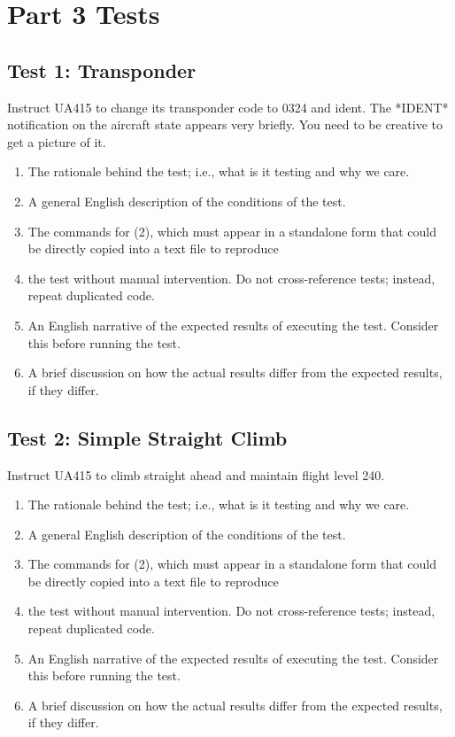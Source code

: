 \documentclass[letterpaper, 12pt]{article}
\begin{document}
\section{Part 3 Tests}

\subsection{Test 1: Transponder}
Instruct UA415 to change its transponder code to 0324 and ident. 
The *IDENT* notification on the aircraft state appears very briefly. You need to be creative to get a picture of it.
\begin{enumerate}
\item The rationale behind the test; i.e., what is it testing and why we care.
\item A general English description of the conditions of the test.
\item The commands for (2), which must appear in a standalone form that could be directly copied into a text file to reproduce
\item the test without manual intervention. Do not cross-reference tests; instead, repeat duplicated code.
\item An English narrative of the expected results of executing the test. Consider this before running the test.
\item A brief discussion on how the actual results differ from the expected results, if they differ.
\end{enumerate}

\subsection{Test 2: Simple Straight Climb}
Instruct UA415 to climb straight ahead and maintain flight level 240.
\begin{enumerate}
\item The rationale behind the test; i.e., what is it testing and why we care.
\item A general English description of the conditions of the test.
\item The commands for (2), which must appear in a standalone form that could be directly copied into a text file to reproduce
\item the test without manual intervention. Do not cross-reference tests; instead, repeat duplicated code.
\item An English narrative of the expected results of executing the test. Consider this before running the test.
\item A brief discussion on how the actual results differ from the expected results, if they differ.
\end{enumerate}
\end{document}

